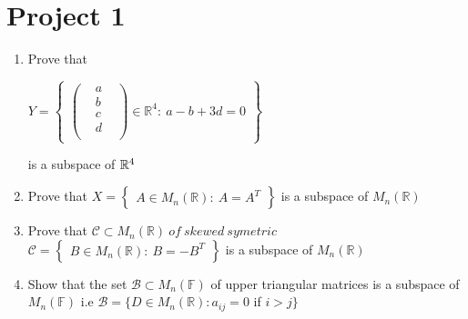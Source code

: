 \documentclass[45pt]{article}
\begin{document}
\section*{\Huge{Project 1}}
\Large{}
\begin{enumerate}
  \item Prove that 

  
  $ Y \pmb{=} \begin{Bmatrix}
    \begin{pmatrix} 
    & a  \\
    & b & \\
    & c & \\
    & d & \\
    \end{pmatrix} \in \mathbb{R}^4 : ~
    a-b+3d\pmb{=}0
    \end{Bmatrix}$
  
is a subspace of $\mathbb{R}^4\\\\$
  
  \item Prove that 
$X \pmb{=} \begin{Bmatrix}
    A \in M_n(\mathbb{R}): ~ A=A^T
    \end{Bmatrix}$ is a subspace of $ M_n(\mathbb{R})$
\item Prove that
$ \mathcal{C} \subset M_n(\mathbb{R}) ~ of ~ skewed~ symetric$ \\
$\mathcal{C} \pmb{=} \begin{Bmatrix}
    B \in M_n(\mathbb{R}): ~ B=-B^T
	\end{Bmatrix}$
is a subspace of $ M_n(\mathbb{R})$
 \item Show that the set  $\mathcal{B}\subset M_n(\mathbb{F})$ of upper triangular matrices is a subspace of $M_n(\mathbb{F})$ i.e $\mathcal{B}=\{ D \in M_n(\mathbb{R}): a_{ij}=0$ if $ i>j \}$

\end{enumerate}
$ $\\
\end{document}
